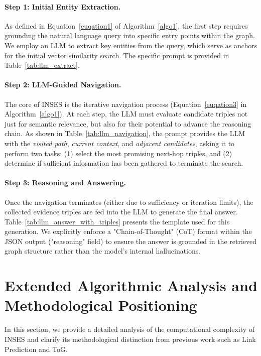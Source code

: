 \documentclass{article}
\theoremstyle{plain}
\theoremstyle{definition}
\theoremstyle{remark}
\begin{document}
\paragraph{Step 1: Initial Entity Extraction.}
As defined in Equation~\ref{euqation1} of Algorithm~\ref{algo1}, the first step requires grounding the natural language query into specific entry points within the graph. We employ an LLM to extract key entities from the query, which serve as anchors for the initial vector similarity search. The specific prompt is provided in Table~\ref{tab:llm_extract}.

\paragraph{Step 2: LLM-Guided Navigation.}
The core of INSES is the iterative navigation process (Equation~\ref{euqation3} in Algorithm~\ref{algo1}). At each step, the LLM must evaluate candidate triples not just for semantic relevance, but also for their potential to advance the reasoning chain. As shown in Table~\ref{tab:llm_navigation}, the prompt provides the LLM with the \textit{visited path}, \textit{current context}, and \textit{adjacent candidates}, asking it to perform two tasks: (1) select the most promising next-hop triples, and (2) determine if sufficient information has been gathered to terminate the search.

\paragraph{Step 3: Reasoning and Answering.}
Once the navigation terminates (either due to sufficiency or iteration limits), the collected evidence triples are fed into the LLM to generate the final answer. Table~\ref{tab:llm_answer_with_triples} presents the template used for this generation. We explicitly enforce a "Chain-of-Thought" (CoT) format within the JSON output ("reasoning" field) to ensure the answer is grounded in the retrieved graph structure rather than the model's internal hallucinations.


\section{Extended Algorithmic Analysis and Methodological Positioning}\label{CC}
In this section, we provide a detailed analysis of the computational complexity of INSES and clarify its methodological distinction from previous work such as Link Prediction and ToG.
\end{document}
